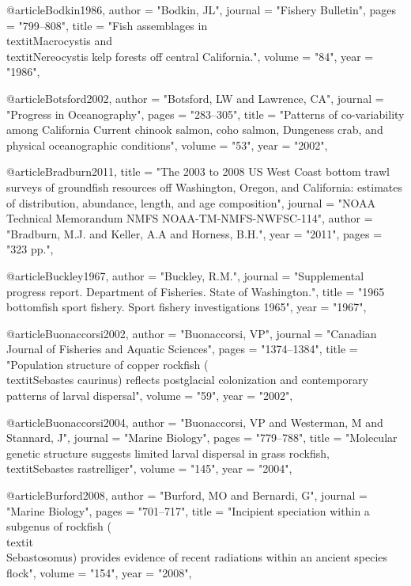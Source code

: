 @article{Bodkin1986,
    author = "{Bodkin, JL}",
    journal = "{Fishery Bulletin}",
    pages = "{799--808}",
    title = "{{Fish assemblages in \\textit{Macrocystis} and \\textit{Nereocystis} kelp forests off central California.}}",
    volume = "{84}",
    year = "{1986}",
}

@article{Botsford2002,
    author = "{Botsford, LW and Lawrence, CA}",
    journal = "{Progress in Oceanography}",
    pages = "{283--305}",
    title = "{{Patterns of co-variability among California Current chinook salmon, coho salmon, Dungeness crab, and physical oceanographic conditions}}",
    volume = "{53}",
    year = "{2002}",
}

@article{Bradburn2011,
    title = "{The 2003 to 2008 {US} {West} {Coast} bottom trawl surveys of groundfish resources off {Washington}, {Oregon}, and {California}: estimates of distribution, abundance, length, and age composition}",
    journal = "{NOAA Technical Memorandum NMFS NOAA-TM-NMFS-NWFSC-114}",
    author = "{Bradburn, M.J. and Keller, A.A and Horness, B.H.}",
    year = "{2011}",
    pages = "{323 pp.}",
}

@article{Buckley1967,
    author = "{Buckley, R.M.}",
    journal = "{Supplemental progress report. Department of Fisheries. State of Washington.}",
    title = "{{1965 bottomfish sport fishery. Sport fishery investigations 1965}}",
    year = "{1967}",
}

@article{Buonaccorsi2002,
    author = "{Buonaccorsi, VP}",
    journal = "{Canadian Journal of Fisheries and Aquatic Sciences}",
    pages = "{1374--1384}",
    title = "{{Population structure of copper rockfish (\\textit{{Sebastes} caurinus}) reflects postglacial colonization and contemporary patterns of larval dispersal}}",
    volume = "{59}",
    year = "{2002}",
}

@article{Buonaccorsi2004,
    author = "{Buonaccorsi, VP and Westerman, M and Stannard, J}",
    journal = "{Marine Biology}",
    pages = "{779--788}",
    title = "{{Molecular genetic structure suggests limited larval dispersal in grass rockfish, \\textit{{Sebastes} rastrelliger}}}",
    volume = "{145}",
    year = "{2004}",
}

@article{Burford2008,
    author = "{Burford, MO and Bernardi, G}",
    journal = "{Marine Biology}",
    pages = "{701--717}",
    title = "{{Incipient speciation within a subgenus of rockfish (\\textit\\{Sebastosomus}) provides evidence of recent radiations within an ancient species flock}}",
    volume = "{154}",
    year = "{2008}",
}

